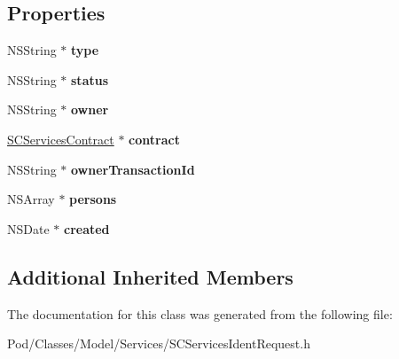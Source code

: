 \subsection*{Properties}
\begin{DoxyCompactItemize}
\item 
N\+S\+String $\ast$ {\bfseries type}\hypertarget{interface_s_c_services_ident_request_afeea2c1ba792eb0f0f0f3ecb5ec2ed75}{}\label{interface_s_c_services_ident_request_afeea2c1ba792eb0f0f0f3ecb5ec2ed75}

\item 
N\+S\+String $\ast$ {\bfseries status}\hypertarget{interface_s_c_services_ident_request_ab20c933b3c700b891629bf1d2cb6ab64}{}\label{interface_s_c_services_ident_request_ab20c933b3c700b891629bf1d2cb6ab64}

\item 
N\+S\+String $\ast$ {\bfseries owner}\hypertarget{interface_s_c_services_ident_request_acd5cd828ce55d6ee8989e4ff413b98f6}{}\label{interface_s_c_services_ident_request_acd5cd828ce55d6ee8989e4ff413b98f6}

\item 
\hyperlink{interface_s_c_services_contract}{S\+C\+Services\+Contract} $\ast$ {\bfseries contract}\hypertarget{interface_s_c_services_ident_request_a2225ad8b00ea464bc06a5a292163340c}{}\label{interface_s_c_services_ident_request_a2225ad8b00ea464bc06a5a292163340c}

\item 
N\+S\+String $\ast$ {\bfseries owner\+Transaction\+Id}\hypertarget{interface_s_c_services_ident_request_aef3c98be8c862c8300bd1863aef695bf}{}\label{interface_s_c_services_ident_request_aef3c98be8c862c8300bd1863aef695bf}

\item 
N\+S\+Array $\ast$ {\bfseries persons}\hypertarget{interface_s_c_services_ident_request_a1b6705edb748f4cf9867c9b38a0130e9}{}\label{interface_s_c_services_ident_request_a1b6705edb748f4cf9867c9b38a0130e9}

\item 
N\+S\+Date $\ast$ {\bfseries created}\hypertarget{interface_s_c_services_ident_request_a06892c02824369b2d3d2e1eac9a018be}{}\label{interface_s_c_services_ident_request_a06892c02824369b2d3d2e1eac9a018be}

\end{DoxyCompactItemize}
\subsection*{Additional Inherited Members}


The documentation for this class was generated from the following file\+:\begin{DoxyCompactItemize}
\item 
Pod/\+Classes/\+Model/\+Services/S\+C\+Services\+Ident\+Request.\+h\end{DoxyCompactItemize}
